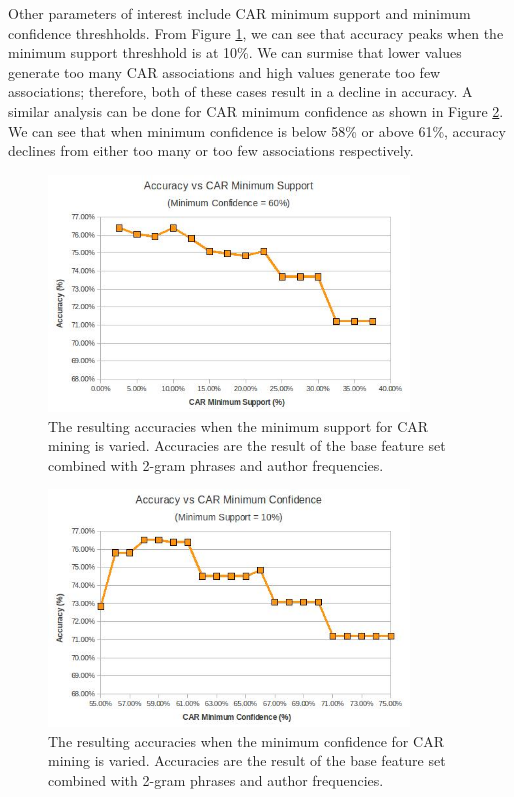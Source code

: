 \documentclass[]{report}
\begin{document}
Other parameters of interest include CAR minimum support and minimum confidence threshholds.  From Figure \ref{fig:CARMinSup}, we can see that accuracy peaks when the minimum support threshhold is at 10\%.  We can surmise that lower values generate too many CAR associations and high values generate too few associations; therefore, both of these cases result in a decline in accuracy.  A similar analysis can be done for CAR minimum confidence as shown in Figure \ref{fig:CARMinConf}.  We can see that when minimum confidence is below 58\% or above 61\%, accuracy declines from either too many or too few associations respectively. 


\begin{figure}[h]
\centering
\includegraphics[width=3.77in]{AccuracyVsCARMinimumSupport.jpg}
\caption{The resulting accuracies when the minimum support for CAR mining is varied.  Accuracies are the result of the base feature set combined with 2-gram phrases and author frequencies.}
\label{fig:CARMinSup}
\end{figure}

\begin{figure}[H]
\centering
\includegraphics[width=3.77in]{AccuracyVsCARMinimumConfidence.jpg}
\caption{The resulting accuracies when the minimum confidence for CAR mining is varied.  Accuracies are the result of the base feature set combined with 2-gram phrases and author frequencies.}
\label{fig:CARMinConf}
\end{figure}
\end{document}
